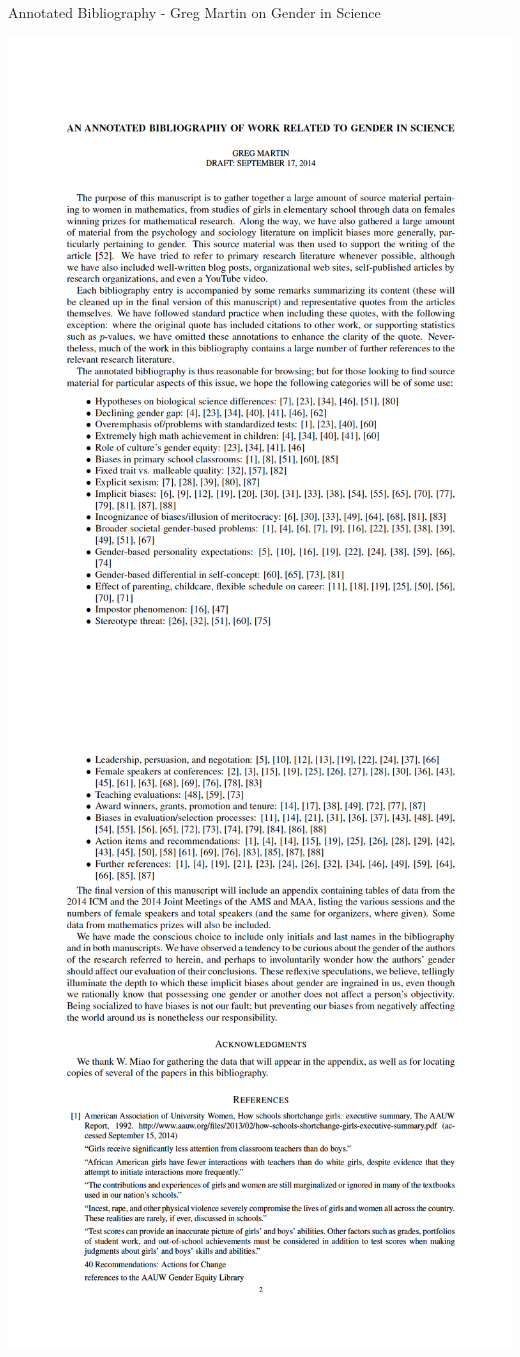 \documentclass{beamer}
\begin{document}
\begin{frame}{Annotated Bibliography - Greg Martin on Gender in Science}
\begin{center}
  \includegraphics[scale=0.25]{gregmartin2}
  \includegraphics[scale=0.25]{gregmartin3}

\end{center}
\end{frame}
\end{document}
